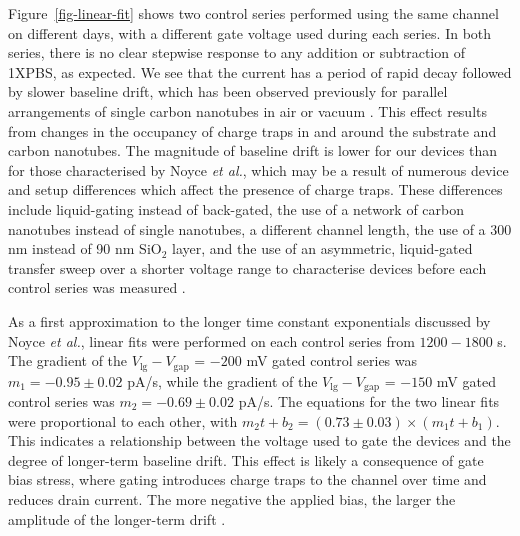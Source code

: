 \documentclass[
  a4paper,
]{scrbook}
\begin{document}
Figure~\ref{fig-linear-fit} shows two control series performed using the
same channel on different days, with a different gate voltage used
during each series. In both series, there is no clear stepwise response
to any addition or subtraction of 1XPBS, as expected. We see that the
current has a period of rapid decay followed by slower baseline drift,
which has been observed previously for parallel arrangements of single
carbon nanotubes in air or vacuum \autocite{Lin2006,Noyce2019}. This
effect results from changes in the occupancy of charge traps in and
around the substrate and carbon nanotubes. The magnitude of baseline
drift is lower for our devices than for those characterised by Noyce
\emph{et al.}, which may be a result of numerous device and setup
differences which affect the presence of charge traps. These differences
include liquid-gating instead of back-gated, the use of a network of
carbon nanotubes instead of single nanotubes, a different channel
length, the use of a 300 nm instead of 90 nm SiO\(_2\) layer, and the
use of an asymmetric, liquid-gated transfer sweep over a shorter voltage
range to characterise devices before each control series was measured
\autocite{Noyce2019}.

As a first approximation to the longer time constant exponentials
discussed by Noyce \emph{et al.}, linear fits were performed on each
control series from \(1200-1800\) s. The gradient of the
\(V_{\textrm{lg}}-V_{\textrm{gap}}\) = \(-200\) mV gated control series
was \(m_{1} = -0.95\pm0.02\) pA/s, while the gradient of the
\(V_{\textrm{lg}}-V_{\textrm{gap}}\) = \(-150\) mV gated control series
was \(m_{2} = -0.69\pm0.02\) pA/s. The equations for the two linear fits
were proportional to each other, with
\(m_{2}t + b_{2} = (0.73 \pm 0.03)\times (m_{1}t + b_{1})\). This
indicates a relationship between the voltage used to gate the devices
and the degree of longer-term baseline drift. This effect is likely a
consequence of gate bias stress, where gating introduces charge traps to
the channel over time and reduces drain current. The more negative the
applied bias, the larger the amplitude of the longer-term drift
\autocite{Bargaoui2018}.
\end{document}
